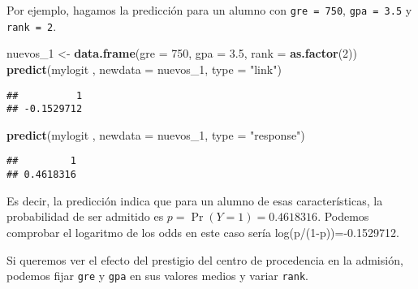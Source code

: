 \documentclass[
]{article}
\newenvironment{Shaded}{\begin{snugshade}}{\end{snugshade}}
\newcommand{\AttributeTok}[1]{\textcolor[rgb]{0.13,0.29,0.53}{#1}}
\newcommand{\DecValTok}[1]{\textcolor[rgb]{0.00,0.00,0.81}{#1}}
\newcommand{\FloatTok}[1]{\textcolor[rgb]{0.00,0.00,0.81}{#1}}
\newcommand{\FunctionTok}[1]{\textcolor[rgb]{0.13,0.29,0.53}{\textbf{#1}}}
\newcommand{\NormalTok}[1]{#1}
\newcommand{\OtherTok}[1]{\textcolor[rgb]{0.56,0.35,0.01}{#1}}
\newcommand{\SpecialCharTok}[1]{\textcolor[rgb]{0.81,0.36,0.00}{\textbf{#1}}}
\newcommand{\StringTok}[1]{\textcolor[rgb]{0.31,0.60,0.02}{#1}}
\begin{document}
Por ejemplo, hagamos la predicción para un alumno con
\texttt{gre\ =\ 750}, \texttt{gpa\ =\ 3.5} y \texttt{rank\ =\ 2}.

\begin{Shaded}
\begin{Highlighting}[]
\NormalTok{nuevos\_1 }\OtherTok{\textless{}{-}} \FunctionTok{data.frame}\NormalTok{(}\AttributeTok{gre =} \DecValTok{750}\NormalTok{, }\AttributeTok{gpa =} \FloatTok{3.5}\NormalTok{, }\AttributeTok{rank =} \FunctionTok{as.factor}\NormalTok{(}\DecValTok{2}\NormalTok{))}
\FunctionTok{predict}\NormalTok{(mylogit , }\AttributeTok{newdata =}\NormalTok{ nuevos\_1, }\AttributeTok{type =} \StringTok{"link"}\NormalTok{)}
\end{Highlighting}
\end{Shaded}

\begin{verbatim}
##          1 
## -0.1529712
\end{verbatim}

\begin{Shaded}
\begin{Highlighting}[]
\FunctionTok{predict}\NormalTok{(mylogit , }\AttributeTok{newdata =}\NormalTok{ nuevos\_1, }\AttributeTok{type =} \StringTok{"response"}\NormalTok{)}
\end{Highlighting}
\end{Shaded}

\begin{verbatim}
##         1 
## 0.4618316
\end{verbatim}

Es decir, la predicción indica que para un alumno de esas
características, la probabilidad de ser admitido es
\(p=\Pr(Y=1)=0.4618316\). Podemos comprobar el logaritmo de los odds en
este caso sería log(p/(1-p))=-0.1529712.

Si queremos ver el efecto del prestigio del centro de procedencia en la
admisión, podemos fijar \texttt{gre} y \texttt{gpa} en sus valores
medios y variar \texttt{rank}.

\begin{Shaded}
\end{Shaded}
\end{document}
